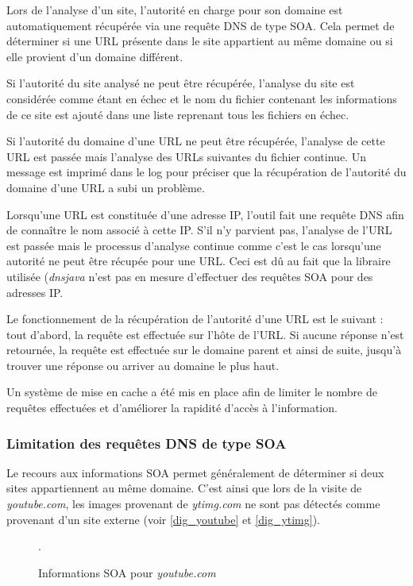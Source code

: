Lors de l'analyse d'un site, l'autorité en charge pour son domaine est automatiquement récupérée via une requête DNS de type SOA. Cela permet de déterminer si une URL présente dans le site appartient au même domaine ou si elle provient d'un domaine différent.

Si l'autorité du site analysé ne peut être récupérée, l'analyse du site est considérée comme étant en échec et le nom du fichier contenant les informations de ce site est ajouté dans une liste reprenant tous les fichiers en échec.

Si l'autorité du domaine d'une URL ne peut être récupérée, l'analyse de cette URL est passée mais l'analyse des URLs suivantes du fichier continue. Un message est imprimé dans le log pour préciser que la récupération de l'autorité du domaine d'une URL a subi un problème.

Lorsqu'une URL est constituée d'une adresse IP, l'outil fait une requête DNS afin de connaître le nom associé à cette IP. S'il n'y parvient pas, l'analyse de l'URL est passée mais le processus d'analyse continue comme c'est le cas lorsqu'une autorité ne peut être récupée pour une URL. Ceci est dû au fait que la libraire utilisée (\textit{dnsjava} n'est pas en mesure d'effectuer des requêtes SOA pour des adresses IP.

Le fonctionnement de la récupération de l'autorité d'une URL est le suivant : tout d'abord, la requête est effectuée sur l'hôte de l'URL. Si aucune réponse n'est retournée, la requête est effectuée sur le domaine parent et ainsi de suite, jusqu'à trouver une réponse ou arriver au domaine le plus haut.

Un système de mise en cache a été mis en place afin de limiter le nombre de requêtes effectuées et d'améliorer la rapidité d'accès à l'information.

\subsubsection{Limitation des requêtes DNS de type SOA}
Le recours aux informations SOA permet généralement de déterminer si deux sites appartiennent au même domaine. C'est ainsi que lors de la visite de \textit{youtube.com}, les images provenant de \textit{ytimg.com} ne sont pas détectés comme provenant d'un site externe (voir \autoref{dig_youtube} et \autoref{dig_ytimg}).

\begin{figure}[h]
	\centering
	
	\caption{\label{dig_youtube}Informations SOA pour \textit{youtube.com}}.
\end{figure}

